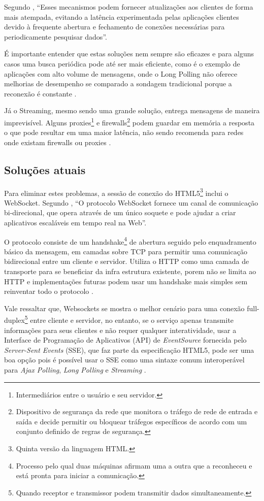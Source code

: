 Segundo , “Esses mecanismos podem fornecer atualizações aos clientes de forma mais atempada, evitando a latência experimentada pelas aplicações clientes devido à frequente abertura e fechamento de conexões necessárias para periodicamente pesquisar dados”.

É importante entender que estas soluções nem sempre são eficazes e para alguns casos uma busca periódica pode até ser mais eficiente, como é o exemplo de aplicações com alto volume de mensagens, onde o Long Polling não oferece melhorias de desempenho se comparado a sondagem tradicional porque a reconexão é constante \cite{Wang2013}.

Já o Streaming, mesmo sendo uma grande solução, entrega mensagens de maneira imprevisível. Alguns proxies\footnote{Intermediários entre o usuário e seu servidor.} e firewalls\footnote{Dispositivo de segurança da rede que monitora o tráfego de rede de entrada e saída e decide permitir ou bloquear tráfegos específicos de acordo com um conjunto definido de regras de segurança.} podem guardar em memória a resposta o que pode resultar em uma maior latência, não sendo recomenda para redes onde existam firewalls ou proxies \cite[p.~6]{Wang2013}.

\subsection{Soluções atuais}

Para eliminar estes problemas, a sessão de conexão do HTML5\footnote{Quinta versão da linguagem HTML.} inclui o WebSocket. Segundo , “O protocolo WebSocket fornece um canal de comunicação bi-direcional, que opera através de um único soquete e pode ajudar a criar aplicativos escaláveis em tempo real na Web”.

O protocolo consiste de um handshake\footnote{Processo pelo qual duas máquinas afirmam uma a outra que a reconheceu e está pronta para iniciar a comunicação.} de abertura seguido pelo enquadramento básico da mensagem, em camadas sobre TCP para permitir uma comunicação bidirecional entre um cliente e servidor. Utiliza o HTTP como uma camada de transporte para se beneficiar da infra estrutura existente, porem não se limita ao HTTP e implementações futuras podem usar um handshake mais simples sem reinventar todo o protocolo \cite{Saint-Andre2011}.

Vale ressaltar que, Websockets se mostra o melhor cenário para uma conexão full-duplex\footnote{Quando receptor e transmissor podem transmitir dados simultaneamente.} entre cliente e servidor, no entanto, se o serviço apenas transmite informações para seus clientes e não requer qualquer interatividade, usar a Interface de Programação de Aplicativos (API) de \emph{EventSource} fornecida pelo \emph{Server-Sent Events} (SSE), que faz parte da especificação HTML5, pode ser uma boa opção pois é possível usar o SSE como uma sintaxe comum interoperável para \emph{Ajax Polling}, \emph{Long Polling} e \emph{Streaming} \cite[p.~10-11]{Wang2013}.